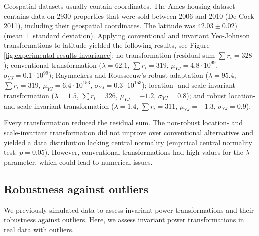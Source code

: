 \documentclass[
  a4paper,
]{article}
\begin{document}
Geospatial datasets usually contain coordinates. The Ames housing
dataset contains data on 2930 properties that were sold between 2006 and
2010 (De Cock 2011), including their geospatial coordinates. The
latitude was \(42.03 \pm 0.02)\) (mean ± standard deviation). Applying
conventional and invariant Yeo-Johnson transformations to latitude
yielded the following results, see Figure
\ref{fig:experimental-results-invariance}: no transformation (residual
sum \(\sum r_i = 328\)); conventional transformation
(\(\lambda = 62.1\), \(\sum r_i = 319\),
\(\mu_{YJ} = 4.8 \cdot 10^{99}\), \(\sigma_{YJ} = 0.1 \cdot 10^{99}\));
Raymaekers and Rousseeuw's robust adaptation (\(\lambda = 95.4\),
\(\sum r_i = 319\), \(\mu_{YJ} = 6.4 \cdot 10^{153}\),
\(\sigma_{YJ} = 0.3 \cdot 10^{153}\)); location- and scale-invariant
transformation (\(\lambda = 1.5\), \(\sum r_i = 326\),
\(\mu_{YJ} = -1.2\), \(\sigma_{YJ} = 0.8\)); and robust location- and
scale-invariant transformation (\(\lambda = 1.4\), \(\sum r_i = 311\),
\(\mu_{YJ} = -1.3\), \(\sigma_{YJ} = 0.9\)).

Every transformation reduced the residual sum. The non-robust location-
and scale-invariant transformation did not improve over conventional
alternatives and yielded a data distribution lacking central normality
(empirical central normality test: \(p=0.05\)). However, conventional
transformations had high values for the \(\lambda\) parameter, which
could lead to numerical issues.

\subsection{Robustness against
outliers}\label{robustness-against-outliers}

We previously simulated data to assess invariant power transformations
and their robustness against outliers. Here, we assess invariant power
transformations in real data with outliers.
\end{document}
